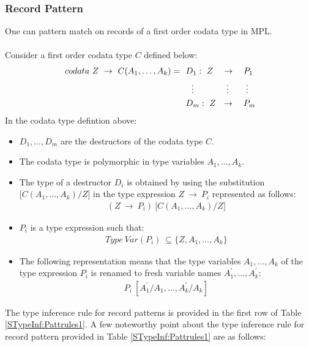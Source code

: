 \documentclass[11pt]{article}
\begin{document}
\subsubsection {Record Pattern}
One can pattern match on records of a first order codata type in MPL. 
~~\\~~\\ 
Consider a first order codata type ${C}$ defined below:
\begin{align*} 
~codata~ Z ~\to~ C(A_1,\ldots,A_k) =
 & ~~ D_1 : ~Z ~~~\to ~~~ P_1 \\
 & ~~~~ \vdots \hskip 3.8em \vdots \hskip 2em \vdots \\ 
 & ~~ D_m : ~Z ~~\to ~~~ P_m
\end{align*}
In the codata type defintion above:
\begin{itemize}
  \item ${D_1,\ldots,D_m}$ are the destructors of the codata type ${C}$.
  \item The codata type is polymorphic in type variables ${A_1,\ldots,A_k}$.
  \item The type of a destructor $D_i$ is obtained by using the substitution ${\big[C(A_1,\ldots,A_k)/Z\big]}$ in the type expression ${Z~\to~P_i}$ represented as follows:
  \begin{align*}
   (Z~\to~P_i)~\big[C(A_1,\ldots,A_k)/Z\big]
  \end{align*}
  \item ${P_i}$ is a type expression such that:
   \begin{align*}
   Type~Var(P_i)~\subseteq \{Z,A_1,\ldots,A_k\}
   \end{align*}
  \item The following representation means that the type variables ${A_1,\ldots,A_k}$ of the type expression ${P_i}$ is renamed to fresh variable names ${A_1^\prime,\ldots,A_k^\prime}$:
   \begin{align*}
   P_i~[A_1^\prime/A_1,\ldots,A_k^\prime/A_k]
   \end{align*} 
\end{itemize}
The type inference rule for record patterns is provided in the first row of Table \ref{STypeInf:Pattrules1}. A few noteworthy point about the type inference rule for record pattern provided in Table \ref{STypeInf:Pattrules1} are as follows:
\end{document}
